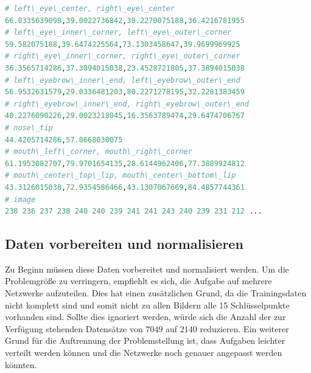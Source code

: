 	\begin{lstlisting}[caption={Ein gesamter Datensatz aus den Trainingsdaten mit den X und Y Werten pro Schlüsselpunkt}, label=fig:ausgangsdatenRoh, captionpos=b, language=Python]
# left\_eye\_center, right\_eye\_center
66.0335639098,39.0022736842,30.2270075188,36.4216781955
# left\_eye\_inner\_corner, left\_eye\_outer\_corner
59.582075188,39.6474225564,73.1303458647,39.9699969925
# right\_eye\_inner\_corner, right\_eye\_outer\_corner
36.3565714286,37.3894015038,23.4528721805,37.3894015038
# left\_eyebrow\_inner\_end, left\_eyebrow\_outer\_end
56.9532631579,29.0336481203,80.2271278195,32.2281383459
# right\_eyebrow\_inner\_end, right\_eyebrow\_outer\_end
40.2276090226,29.0023218045,16.3563789474,29.6474706767
# nose\_tip
44.4205714286,57.0668030075
# mouth\_left\_corner, mouth\_right\_corner
61.1953082707,79.9701654135,28.6144962406,77.3889924812
# mouth\_center\_top\_lip, mouth\_center\_bottom\_lip
43.3126015038,72.9354586466,43.1307067669,84.4857744361
# image
238 236 237 238 240 240 239 241 241 243 240 239 231 212 ...
\end{lstlisting}

\subsection{Daten vorbereiten und normalisieren}

Zu Beginn müssen diese Daten vorbereitet und normalisiert werden. 
Um die Problemgröße zu verringern, empfiehlt es sich, die Aufgabe auf mehrere Netzwerke aufzuteilen. 
Dies hat einen zusätzlichen Grund, da die Trainingsdaten nicht komplett sind und somit nicht zu allen Bildern alle 15 Schlüsselpunkte vorhanden sind. 
Sollte dies ignoriert werden, würde sich die Anzahl der zur Verfügung stehenden Datensätze von $7049$ auf $2140$ reduzieren. 
Ein weiterer Grund für die Auftrennung der Problemstellung ist, dass Aufgaben leichter verteilt werden können und die Netzwerke noch genauer angepasst werden könnten. \newline

